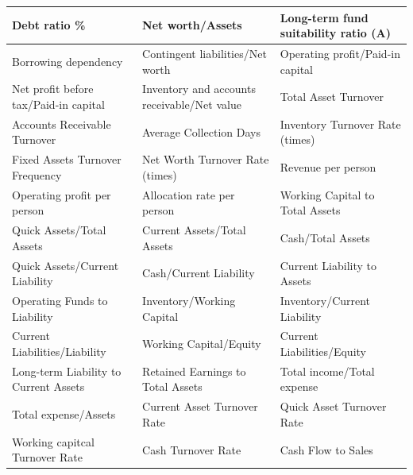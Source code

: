 \documentclass[12pt]{report}
\begin{document}
\begin{table}[H]
\begin{adjustbox}{width=\columnwidth,center}
\begin{tabular}{|l|l|l|}
Debt ratio \%                                           & Net worth/Assets                            & Long-term fund suitability ratio (A)               \\ \hline
Borrowing dependency                                    & Contingent liabilities/Net worth            & Operating profit/Paid-in capital                   \\ \hline
Net profit before tax/Paid-in capital                   & Inventory and accounts receivable/Net value & Total Asset Turnover                               \\ \hline
Accounts Receivable Turnover                            & Average Collection Days                     & Inventory Turnover Rate (times)                    \\ \hline
Fixed Assets Turnover Frequency                         & Net Worth Turnover Rate (times)             & Revenue per person                                 \\ \hline
Operating profit per person                             & Allocation rate per person                  & Working Capital to Total Assets                    \\ \hline
Quick Assets/Total Assets                               & Current Assets/Total Assets                 & Cash/Total Assets                                  \\ \hline
Quick Assets/Current Liability                          & Cash/Current Liability                      & Current Liability to Assets                        \\ \hline
Operating Funds to Liability                            & Inventory/Working Capital                   & Inventory/Current Liability                        \\ \hline
Current Liabilities/Liability                           & Working Capital/Equity                      & Current Liabilities/Equity                         \\ \hline
Long-term Liability to Current Assets                   & Retained Earnings to Total Assets           & Total income/Total expense                         \\ \hline
Total expense/Assets                                    & Current Asset Turnover Rate                 & Quick Asset Turnover Rate                          \\ \hline
Working capitcal Turnover Rate                          & Cash Turnover Rate                          & Cash Flow to Sales                                 \\ \hline

\end{tabular}
\end{adjustbox}
\end{table}
\end{document}
